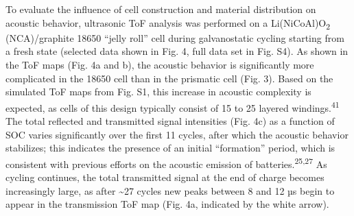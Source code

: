 \documentclass[]{article}
\begin{document}
{ }To evaluate the influence of cell construction and material
distribution on acoustic behavior, ultrasonic ToF analysis was performed
on a Li(NiCoAl)O\textsubscript{2} (NCA)/graphite 18650 ``jelly roll''
cell during galvanostatic cycling starting from a fresh state (selected
data shown in Fig. 4, full data set in Fig. S4). As shown in the ToF
maps (Fig. 4a and b), the acoustic behavior is significantly more
complicated in the 18650 cell than in the prismatic cell (Fig. 3). Based
on the simulated ToF maps from Fig. S1, this increase in acoustic
complexity is expected, as cells of this design typically consist of 15
to 25 layered windings.\textsuperscript{41} The total reflected and
transmitted signal intensities (Fig. 4c) as a function of SOC varies
significantly over the first 11 cycles, after which the acoustic
behavior stabilizes; this indicates the presence of an initial
``formation'' period, which is consistent with previous efforts on the
acoustic emission of batteries.\textsuperscript{25,27} As cycling
continues, the total transmitted signal at the end of charge becomes
increasingly large, as after \textasciitilde{}27 cycles new peaks
between 8 and 12 µs begin to appear in the transmission ToF map (Fig.
4a, indicated by the white arrow).
\end{document}
